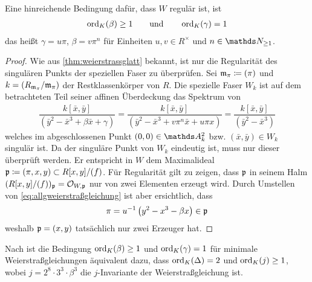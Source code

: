 \begin{Korollar}\label{thm:c1red}
  \label{bem:bedregweierstraßmodell}
  Eine hinreichende Bedingung dafür, dass $W$ regulär ist, ist
  \begin{gather*}
    \operatorname{ord}_{K}(\beta)\geq 1
    \qquad\text{und}\qquad
    \operatorname{ord}_{K}(\gamma)=1
  \end{gather*}
  das heißt $\gamma=u\pi$, $\beta=v\pi^n$ für Einheiten $u,v\in R^\times$
  und $n\in\N_{\geq1}$.

  \begin{proof}
    Wie aus \ref{thm:weierstrassglatt} bekannt, ist nur die
    Regularität des singulären Punkts der speziellen Faser zu
    überprüfen.
    Sei $\mathfrak{m}_\pi\coloneqq(\pi)$ und $k=(R_{\mathfrak{m}_\pi}/\mathfrak{m}_\pi)$ der
    Restklassenkörper von $R$.
    Die spezielle Faser $W_k$ ist auf dem betrachteten Teil seiner
    affinen Überdeckung das Spektrum von 
    \begin{gather*}
      \dfrac{k[\bar x,\bar y]}{(\bar y^2-\bar x^3+\beta \bar x+\gamma)}
      =\dfrac{k[\bar x,\bar y]}{(\bar y^2-\bar x^3+v\pi^n \bar x+u\pi x)}
      =\dfrac{k[\bar x,\bar y]}{(\bar y^2-\bar x^3)}
    \end{gather*}
    welches im abgeschlossenen Punkt $(0,0)\in\A_k^2$ bzw.
    $(\bar x,\bar y)\in W_k$ singulär ist. Da der singuläre Punkt von
    $W_k$ eindeutig ist, muss nur dieser überprüft werden.
    Er entspricht in $W$ dem Maximalideal
    $\mathfrak{p}\coloneqq(\pi,x,y)\subset R[x,y]/(f)$.
    Für Regularität gilt zu zeigen, dass $\mathfrak{p}$ in seinem Halm
    $(R[x,y]/(f))_{\mathfrak{p}}=\mathcal{O}_{W,\mathfrak{p}}$ nur von zwei Elementen erzeugt wird.
    Durch Umstellen von \eqref{eq:allgweierstraßgleichung} ist aber
    ersichtlich, dass
    \begin{gather*}
      \pi = u^{-1}\left( y^2-x^3-\beta x \right)\in\mathfrak{p}
    \end{gather*}
    weshalb $\mathfrak{p}=(x,y)$ tatsächlich nur zwei Erzeuger hat.
  \end{proof}
\end{Korollar}

\begin{Bemerkung}
Nach \cite[Chapter 1.5, Lemma 3 and Lemma 4]{neron} ist die
Bedingung $\operatorname{ord}_{K}(\beta)\geq 1$ und $\operatorname{ord}_{K}(\gamma)=1$ für
minimale Weierstraßgleichungen äquivalent dazu,
dass $\operatorname{ord}_{K}(\Delta)=2$ und $\operatorname{ord}_{K}(j)\geq 1$,
wobei $j=2^8\cdot 3^3\cdot\beta^3$ die $j$-Invariante der
Weierstraßgleichung ist.
\end{Bemerkung}

